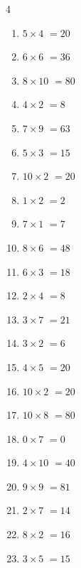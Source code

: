 \begin{multicols}{4}
\begin{enumerate}
  \item $5\times 4$
        $=20$

\columnbreak %

  \item $6\times 6$
        $=36$

  \item $8\times 10$
        $=80$

  \item $4\times 2$
        $=8$

  \item $7\times 9$
        $=63$

  \item $5\times 3$
        $=15$

  \item $10\times 2$
        $=20$

  \item $1\times 2$
        $=2$

  \item $7\times 1$
        $=7$

  \item $8\times 6$
        $=48$

  \item $6\times 3$
        $=18$

  \item $2\times 4$
        $=8$

  \item $3\times 7$
        $=21$

  \item $3\times 2$
        $=6$

  \item $4\times 5$
        $=20$

  \item $10\times 2$
        $=20$

  \item $10\times 8$
        $=80$

  \item $0\times 7$
        $=0$

  \item $4\times 10$
        $=40$

  \item $9\times 9$
        $=81$

  \item $2\times 7$
        $=14$

  \item $8\times 2$
        $=16$

  \item $3\times 5$
        $=15$


\end{enumerate}
\end{multicols}
